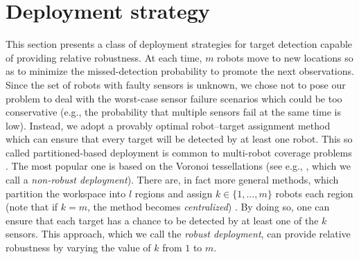 \documentclass[letterpaper, 10 pt, conference]{ieeeconf}
\newcommand{\Ram}[1]{{\normalsize{\textbf{({\color{green}Ram:\ }#1)}}}}
\begin{document}
\section{Deployment strategy}
\label{sec:sec4}
This section presents a class of deployment strategies for target detection capable of providing relative robustness.
At each time, $m$ robots move to new locations so as to minimize the missed-detection probability to promote the next observations. Since the set of robots with faulty sensors is unknown, we chose not to pose our problem to deal with the worst-case sensor failure scenarios which could be too conservative (e.g., the probability that multiple sensors fail at the same time is low). Instead, we adopt a provably optimal robot--target assignment method which can ensure that every target will be detected by at least one robot.
This so called partitioned-based deployment is common to multi-robot coverage problems \cite{cortes_coverage_2004,hutchinson_robust_2012,schwager2009decentralized,park2014robust}. 
The most popular one is based on the Voronoi tessellations (see e.g., \cite{cortes_coverage_2004}, which we call a \emph{non-robust deployment}).
There are, in fact more general methods, which partition the workspace into $l$ regions and assign $k \in \lbrace 1,\dots,m \rbrace$ robots each region (note that if $k=m$, the method becomes \emph{centralized}) \cite{hutchinson_robust_2012}. 
By doing so, one can ensure that each target has a chance to be detected by at least one of the $k$ sensors.
This approach, which we call the \emph{robust deployment}, can provide relative robustness by varying the value of $k$ from $1$ to $m$.

\end{document}

